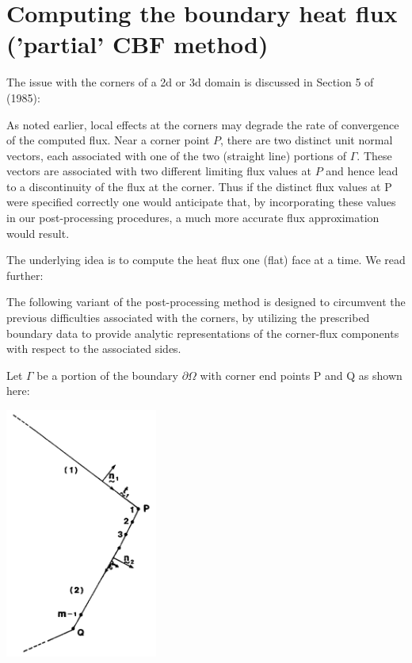 \section*{Computing the boundary heat flux ('partial' CBF method)}

The issue with the corners of a 2d or 3d domain 
is discussed in Section 5 of \textcite{cacs85} (1985):
\begin{displayquote}
{\color{MidnightBlue}
As noted earlier, local effects at the corners may degrade the rate of convergence of the
computed flux. Near a corner point $P$, there are two distinct unit normal vectors, each
associated with one of the two (straight line) portions of $\Gamma$. These vectors are associated with
two different limiting flux values at $P$ and hence lead to a discontinuity of the flux at the
corner. Thus if the distinct flux values at P were specified correctly one would anticipate that,
by incorporating these values in our post-processing procedures, a much more accurate flux
approximation would result.}
\end{displayquote}

The underlying idea is to compute the heat flux one (flat) face at a time.
We read further:
\begin{displayquote}
{\color{MidnightBlue}
The following variant of the post-processing method is designed to circumvent the previous
difficulties associated with the corners, by utilizing the prescribed boundary data to provide
analytic representations of the corner-flux components with respect to the associated sides.}
\end{displayquote}

Let $\Gamma$ be a portion of the boundary $\partial \Omega$ 
with corner end points P and Q as shown here:
\begin{center}
\includegraphics[width=5cm]{python_codes/fieldstone_173/images/cacs85.png}
\end{center}

